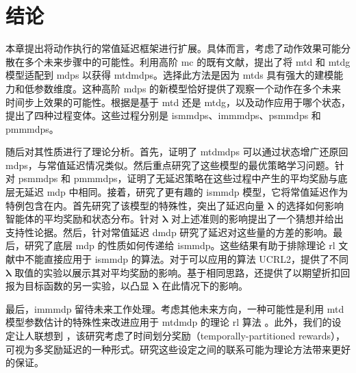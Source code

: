 \section{结论}

本章提出将动作执行的常值延迟框架进行扩展。具体而言，考虑了动作效果可能分散在多个未来步骤中的可能性。利用高阶 \gls{mc} 的既有文献，提出了将 \gls{mtd} 和 \gls{mtdg} 模型适配到 \glspl{mdp} 以获得 \glspl{mtdmdp}。选择此方法是因为 \glspl{mtd} 具有强大的建模能力和低参数维度。这种高阶 \glspl{mdp} 的新模型恰好提供了观察一个动作在多个未来时间步上效果的可能性。根据是基于 \gls{mtd} 还是 \gls{mtdg}，以及动作应用于哪个状态，提出了四种过程变体。这些过程分别是 \glspl{ismmdp}、\glspl{immmdp}、\glspl{psmmdp} 和 \glspl{pmmmdp}。

随后对其性质进行了理论分析。首先，证明了 \glspl{mtdmdp} 可以通过状态增广还原回 \glspl{mdp}，与常值延迟情况类似。然后重点研究了这些模型的最优策略学习问题。针对 \glspl{psmmdp} 和 \glspl{pmmmdp}，证明了无延迟策略在这些过程中产生的平均奖励与底层无延迟 \gls{mdp} 中相同。接着，研究了更有趣的 \gls{ismmdp} 模型，它将常值延迟作为特例包含在内。首先研究了该模型的特殊性，突出了延迟向量 $\boldsymbol\lambda$ 的选择如何影响智能体的平均奖励和状态分布。针对 $\boldsymbol\lambda$ 对上述准则的影响提出了一个猜想并给出支持性论据。然后，针对常值延迟 \gls{dmdp} 研究了延迟对这些量的方差的影响。最后，研究了底层 \gls{mdp} 的性质如何传递给 \gls{ismmdp}。这些结果有助于排除理论 \gls{rl} 文献中不能直接应用于 \gls{ismmdp} 的算法。对于可以应用的算法 UCRL2，提供了不同 $\boldsymbol\lambda$ 取值的实验以展示其对平均奖励的影响。基于相同思路，还提供了以期望折扣回报为目标函数的另一实验，以凸显 $\boldsymbol\lambda$ 在此情况下的影响。

最后，\gls{immmdp} 留待未来工作处理。考虑其他未来方向，一种可能性是利用 \gls{mtd} 模型参数估计的特殊性来改进应用于 \gls{mtdmdp} 的理论 \gls{rl} 算法 \cite{berchtold2002mixture}。此外，我们的设定让人联想到 \cite{romano2022multi}，该研究考虑了时间划分奖励（temporally-partitioned rewards），可视为多奖励延迟的一种形式。研究这些设定之间的联系可能为理论方法带来更好的保证。